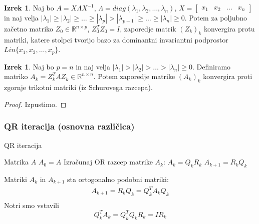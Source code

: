 \documentclass[a4paper,12pt]{article}
\theoremstyle{definition}
\newtheorem{theorem}[counter]{Izrek}
\theoremstyle{remark}
\newcommand{\R}{\mathbb{R}}
\begin{document}
\begin{theorem}
    Naj bo $A = X \Lambda X^{-1}$, $\Lambda = diag(\lambda_1, \lambda_2, \dots, \lambda_n)$, $X = \begin{bmatrix}
        x_1 & x_2 & \dots & x_n
    \end{bmatrix}$ in naj velja $|\lambda_1| \geq |\lambda_2| \geq \dots \geq |\lambda_p| > |\lambda_{p+1}| \geq \dots \geq |\lambda_n| \geq 0$.
    Potem za poljubno začetno matriko $Z_0 \in \R^{n \times p}$, $Z_0^T Z_0 = I$, zaporedje matrik $(Z_k)_k$ konvergira protu matriki,
    katere stolpci tvorijo bazo za dominantni invariantni podprostor $Lin\{x_1, x_2, \dots, x_p\}$.
\end{theorem}

\begin{theorem}
    Naj bo $p = n$ in naj velja $| \lambda_1 | > | \lambda_2 | > \dots > | \lambda_n | \geq 0$. Definiramo matriko $A_k = Z_k^T A Z_k \in \R^{n \times n}$.
    Potem zaporedje matrike $(A_k)_k$ konvergira proti zgornje trikotni matriki (iz Schurovega razcepa).
\end{theorem}

\begin{proof}
    Izpustimo.
\end{proof}


\subsubsection{QR iteracija (osnovna različica)}




\begin{algorithm}
\caption{QR iteracija}
\begin{algorithmic}[1]
\Require Matrika $A$
\State $A_0 = A$
    \State Izračunaj OR razcep matrike $A_k$: $A_k = Q_k R_k$
    \State $A_{k+1} = R_k Q_k$
\EndWhile
\end{algorithmic}
\end{algorithm}



Matriki $A_k$ in $A_{k+1}$ sta ortogonalno podobni matriki:
\begin{gather*}
    A_{k+1} = R_k Q_k = Q_k^T A_k Q_k\\
\end{gather*}
Notri smo vstavili
\begin{equation*}
    Q_k^T A_k = Q_k^T Q_k R_k = I R_k
\end{equation*}
\end{document}
